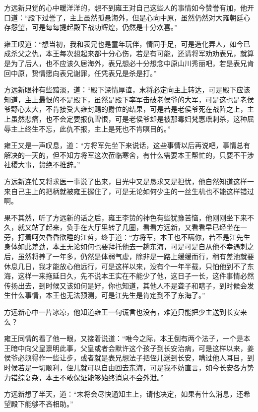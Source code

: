 方远新只觉的心中暖洋洋的，想不到雍王对自己这些人的事情如今赞誉有加，他开口道：“殿下过誉了，主上虽然孤悬海外，但是心向中原，虽然仍然对大雍朝廷心存怨望，可是每每提起殿下战功辉煌，仍然是十分欢喜。”

雍王叹道：“想当初，我和表兄也是童年玩伴，情同手足，可是造化弄人，如今已成杀父之仇，本王每次想起来都十分心伤，若是有可能，还请将军劝劝表兄，就算是为了后人，也不应该久居海外，表兄想必十分想念中原山川秀丽吧，若是表兄肯回中原，贽情愿向表兄谢罪，任凭表兄是杀是打。”

方远新眼神有些黯淡，道：“殿下深情厚谊，末将必定向主上转达，可是殿下应该知道，主上最恨的不是殿下，虽然是殿下率军击破老侯爷的大军，可是这也是老侯爷野心太大，不肯接受大雍封赐的爵位的结果，可是若是老侯爷死在战阵之上，主上虽然悲痛，也不会定要报仇雪恨，可是老侯爷却是被那毒妇梵惠瑶刺杀，这种屈辱主上终生不忘，此仇不报，主上是死也不肯瞑目的。”

雍王又是一声叹息，道：“方将军先坐下来说话，这些事情以后再说吧，事情总有解决的一天的，但不知方将军这次莅临寒舍，有什么需要本王帮忙的，只要不干涉社稷大事，贽绝不推辞。”

方远新连忙又将求医一事说了出来，目光中又是恳求又是担忧，他自然知道这样一来自己主上的把柄就被雍王握住了，可是无论如何少主的一丝生机也不能这样错过啊。

果不其然，听了方远新的话之后，雍王李贽的神色有些犹豫苦恼，他刚刚坐下来不久，就又站了起来，负手在大厅里转了几圈，看看方远新，又看看早已经坐在一旁，打着呵欠昏昏欲睡的江哲，终于道：“方将军，本王也不瞒你，若不是江先生身体如此差劲，本王无论如何也要拜托他去一趟东海，可是可是自从他不幸遇刺之后，虽然将养了一年多，仍然是体弱气虚，除非是一路上缓缓而行，稍有差池就要休息几日，我才能放心他远行，可是这样以来，没有个一年半载，只怕他到不了东海，这样一来拖延日久，先不说本王实在不能少了他，这日子一长，这件事情必然传扬出去，到时候又该如何是好，你也知道，其他人不是聋子和瞎子，到时候会发生什么事情，本王也无法预测，可是江先生是肯定到不了东海了。”

方远新心中一片冰凉，他知道雍王一句谎言也没有，难道只能把少主送到长安来么？

雍王同情的看了他一眼，又接着说道：“唯今之际，本王倒有两个法子，一个是本王暗中向父皇禀明此事，父皇或者会默许这个孩子到长安治病，可是这样以来，姜侯爷必须得作一些让步，或者就是表兄想法子把侄儿送到长安，瞒过他人耳目，到时候若是一切顺利，侄儿就可以自由回去东海，可是我不妨直言，如今长安各方势力错综复杂，本王不敢保证能够始终消息不会外泄。”

方远新想了半天，道：“末将会尽快通知主上，请他决定，如果有什么消息，还希望殿下能够不吝相助。”

